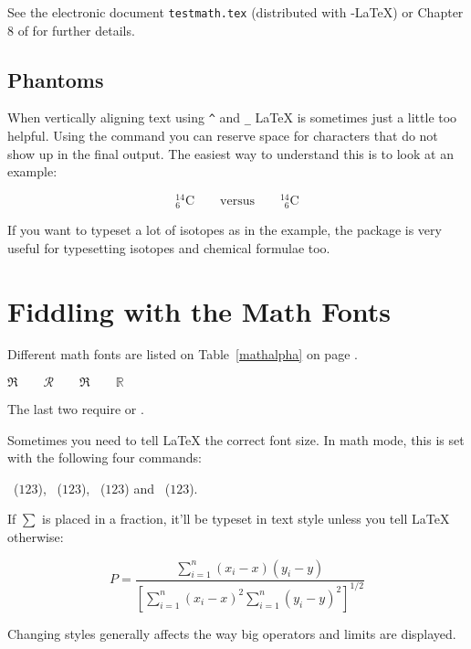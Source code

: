See the electronic document \texttt{testmath.tex} (distributed with
\AmS-\LaTeX) or Chapter 8 of \companion{} for further details.

\subsection{Phantoms}

When vertically aligning text using \verb|^| and \verb|_| \LaTeX{} is sometimes
just a little too helpful. Using the  command you can
reserve space for characters that do not show up in the final output.
The easiest way to understand this is to look at an example:
\begin{example}
\begin{equation*}
{}^{14}_{6}\text{C}
\qquad \text{versus} \qquad
{}^{14}_{\phantom{1}6}\text{C}
\end{equation*}
\end{example}
If you want to typeset a lot of isotopes as in the example, the 
package is very useful for typesetting isotopes and chemical formulae too.


\section{Fiddling with the Math Fonts}\label{sec:fontsz}
Different math fonts are listed on Table~\ref{mathalpha} on page
\pageref{mathalpha}.
\begin{example}
 $\Re \qquad
  \mathcal{R} \qquad
  \mathfrak{R} \qquad
  \mathbb{R} \qquad $  
\end{example}
The last two require  or .

Sometimes you need to tell \LaTeX{} the correct font
size. In math mode, this is set with the following four commands:
\begin{flushleft}
~($\displaystyle 123$),
 ~($\textstyle 123$), 
~($\scriptstyle 123$) and
~($\scriptscriptstyle 123$).
\end{flushleft}

If $\sum$ is placed in a fraction, it'll be typeset in text style unless you tell
\LaTeX{} otherwise:
\begin{example}
\begin{equation*}
 P = \frac{\displaystyle{ 
   \sum_{i=1}^n (x_i- x)
   (y_i- y)}} 
   {\displaystyle{\left[
   \sum_{i=1}^n(x_i-x)^2
   \sum_{i=1}^n(y_i- y)^2
   \right]^{1/2}}}
\end{equation*}    
\end{example}
Changing styles generally affects the way big operators and limits are displayed.

